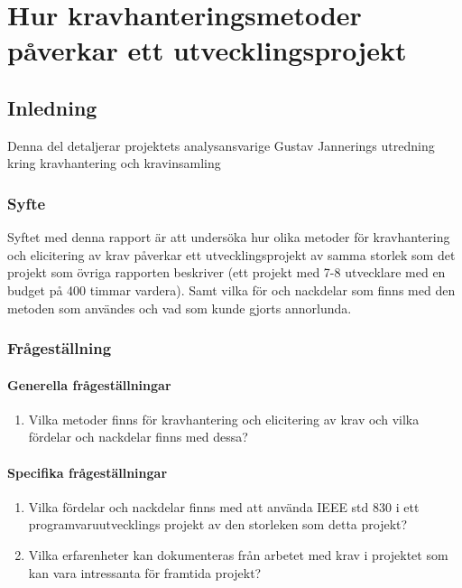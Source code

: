 \chapter{Hur kravhanteringsmetoder påverkar ett utvecklingsprojekt}
\label{cha:indiv-report-jannering}

\section{Inledning}
\label{sec:introduction-jannering}

Denna del detaljerar projektets analysansvarige Gustav Jannerings utredning kring kravhantering och kravinsamling

\subsection{Syfte}
\label{sec:purpose-jannering}


Syftet med denna rapport är att undersöka hur olika metoder för kravhantering och elicitering av krav påverkar ett utvecklingsprojekt av samma storlek som det projekt som övriga rapporten beskriver (ett projekt med 7-8 utvecklare med en budget på 400 timmar vardera). Samt vilka för och nackdelar som finns med den metoden som användes och vad som kunde gjorts annorlunda.

\subsection{Frågeställning}
\label{sec:issue-jannering}

\subsubsection{Generella frågeställningar}
\begin{enumerate}
	\item Vilka metoder finns för kravhantering och elicitering av krav och vilka fördelar och nackdelar finns med dessa? 
\end{enumerate}
\subsubsection{Specifika frågeställningar}
\begin{enumerate}
	\item Vilka fördelar och nackdelar finns med att använda IEEE std 830 i ett programvaruutvecklings projekt av den storleken som detta projekt?
	
	\item Vilka erfarenheter kan dokumenteras från arbetet med krav i projektet som kan vara intressanta för framtida projekt?
	
\end{enumerate}
